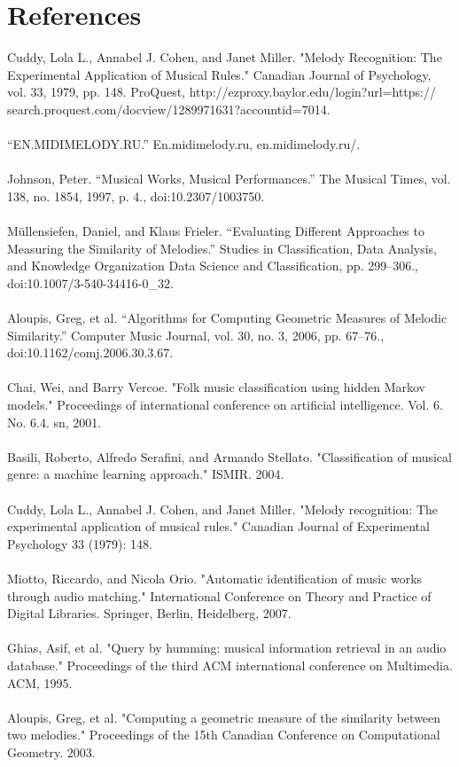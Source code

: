 \documentclass{article}
\begin{document}
	\section{References}
	Cuddy, Lola L., Annabel J. Cohen, and Janet Miller. "Melody Recognition: The Experimental Application of Musical Rules." Canadian Journal of Psychology, vol. 33, 1979, pp. 148. ProQuest, http://ezproxy.baylor.edu/login?url=https://\\search.proquest.com/docview/1289971631?accountid=7014.
	\\ \\
	“EN.MIDIMELODY.RU.” En.midimelody.ru, en.midimelody.ru/.
	\\ \\
	Johnson, Peter. “Musical Works, Musical Performances.” The Musical Times, vol. 138, no. 1854, 1997, p. 4., doi:10.2307/1003750.
	\\ \\
	Müllensiefen, Daniel, and Klaus Frieler. “Evaluating Different Approaches to Measuring the Similarity of Melodies.” Studies in Classification, Data Analysis, and Knowledge Organization Data Science and Classification, pp. 299–306., doi:10.1007/3-540-34416-0\_32.
	\\ \\
	Aloupis, Greg, et al. “Algorithms for Computing Geometric Measures of Melodic Similarity.” Computer Music Journal, vol. 30, no. 3, 2006, pp. 67–76., \\doi:10.1162/comj.2006.30.3.67.
	\\ \\
	Chai, Wei, and Barry Vercoe. "Folk music classification using hidden Markov models." Proceedings of international conference on artificial intelligence. Vol. 6. No. 6.4. sn, 2001.
	\\ \\
	Basili, Roberto, Alfredo Serafini, and Armando Stellato. "Classification of musical genre: a machine learning approach." ISMIR. 2004.
	\\ \\
	Cuddy, Lola L., Annabel J. Cohen, and Janet Miller. "Melody recognition: The experimental application of musical rules." Canadian Journal of Experimental Psychology 33 (1979): 148.
	\\ \\
	Miotto, Riccardo, and Nicola Orio. "Automatic identification of music works through audio matching." International Conference on Theory and Practice of Digital Libraries. Springer, Berlin, Heidelberg, 2007.
	\\ \\
	Ghias, Asif, et al. "Query by humming: musical information retrieval in an audio database." Proceedings of the third ACM international conference on Multimedia. ACM, 1995.
	\\ \\
	Aloupis, Greg, et al. "Computing a geometric measure of the similarity between two melodies." Proceedings of the 15th Canadian Conference on Computational Geometry. 2003.
	\\
	
\end{document}

